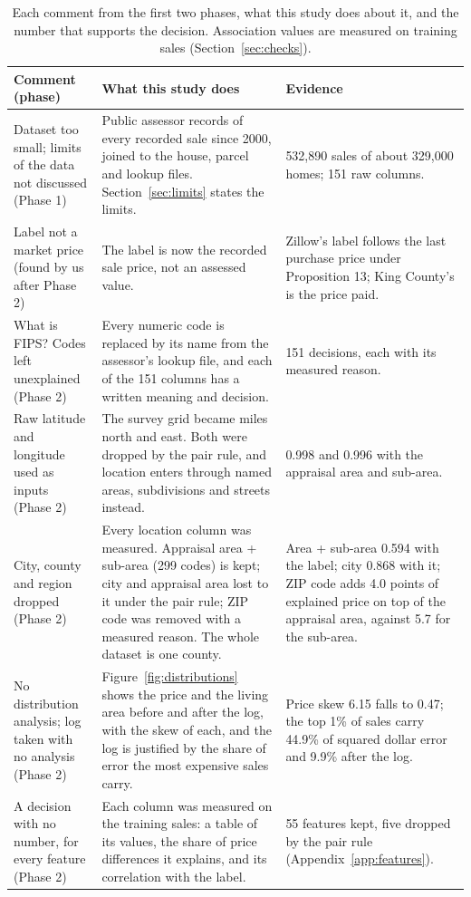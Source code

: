 \documentclass[sigconf,nonacm,10pt]{acmart}
\begin{document}
\begin{table}[t]
\caption{Each comment from the first two phases, what this study does about it, and the number that supports the decision. Association values are measured on training sales (Section~\ref{sec:checks}).}
\label{tab:feedback}
\small
\renewcommand{\arraystretch}{1.2}
\begin{tabularx}{\textwidth}{@{}L{3.6cm}YY@{}}
\toprule
Comment (phase) & What this study does & Evidence \\
\midrule
Dataset too small; limits of the data not discussed (Phase 1) & Public assessor records of every recorded sale since 2000, joined to the house, parcel and lookup files. Section~\ref{sec:limits} states the limits. & 532,890 sales of about 329,000 homes; 151 raw columns. \\
Label not a market price (found by us after Phase 2) & The label is now the recorded sale price, not an assessed value. & Zillow's label follows the last purchase price under Proposition 13; King County's is the price paid. \\
What is FIPS? Codes left unexplained (Phase 2) & Every numeric code is replaced by its name from the assessor's lookup file, and each of the 151 columns has a written meaning and decision. & 151 decisions, each with its measured reason. \\
Raw latitude and longitude used as inputs (Phase 2) & The survey grid became miles north and east. Both were dropped by the pair rule, and location enters through named areas, subdivisions and streets instead. & 0.998 and 0.996 with the appraisal area and sub-area. \\
City, county and region dropped (Phase 2) & Every location column was measured. Appraisal area + sub-area (299 codes) is kept; city and appraisal area lost to it under the pair rule; ZIP code was removed with a measured reason. The whole dataset is one county. & Area + sub-area 0.594 with the label; city 0.868 with it; ZIP code adds 4.0 points of explained price on top of the appraisal area, against 5.7 for the sub-area. \\
No distribution analysis; log taken with no analysis (Phase 2) & Figure~\ref{fig:distributions} shows the price and the living area before and after the log, with the skew of each, and the log is justified by the share of error the most expensive sales carry. & Price skew 6.15 falls to 0.47; the top 1\% of sales carry 44.9\% of squared dollar error and 9.9\% after the log. \\
A decision with no number, for every feature (Phase 2) & Each column was measured on the training sales: a table of its values, the share of price differences it explains, and its correlation with the label. & 55 features kept, five dropped by the pair rule (Appendix~\ref{app:features}). \\

\end{tabularx}
\end{table}
\end{document}
